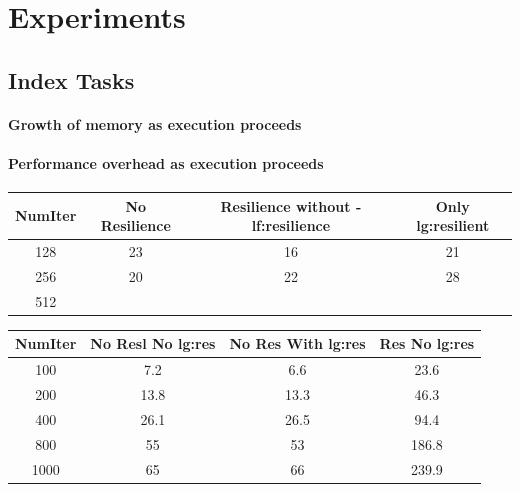 
\section{Experiments}

\subsection{Index Tasks}

\paragraph{Growth of memory as execution proceeds}
\paragraph{Performance overhead as execution proceeds}


\begin{center}
 \begin{tabular}{||c | c | c | c||} 
 \hline
 NumIter& No Resilience & Resilience without -lf:resilience & Only lg:resilient \\ [0.25ex] 
 \hline\hline
128 & 23 & 16 & 21\\ 
 \hline
256 & 20 & 22 & 28\\ 
 \hline
512 & \\ [1ex] 
 \hline
\end{tabular}
\end{center}




\begin{center}
 \begin{tabular}{||c | c | c | c||} 
 \hline
 NumIter& No Resl No lg:res & No Res With lg:res & Res No lg:res \\ [0.25ex] 
 \hline\hline
100 &  7.2 & 6.6 & 23.6\\ 
 \hline
200 &  13.8 & 13.3 & 46.3\\ 
 \hline
400 &  26.1 & 26.5 & 94.4\\ 
 \hline
800 &  55 & 53 & 186.8\\ 
 \hline
1000 &  65 & 66 & 239.9\\ [1ex] 
 \hline
\end{tabular}
\end{center}

